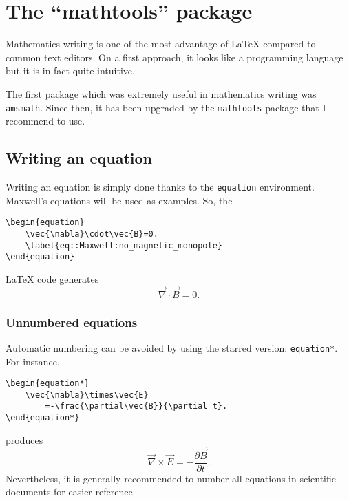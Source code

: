 

\chapter{The \enquote{mathtools} package}

Mathematics writing is one of the most advantage of \LaTeX{} compared to common text editors.
On a first approach, it looks like a programming language but it is in fact quite intuitive.

The first package which was extremely useful in mathematics writing was \texttt{amsmath}.
Since then, it has been upgraded by the \texttt{mathtools} package that I recommend to use.


\section{Writing an equation}

	Writing an equation is simply done thanks to the \texttt{equation} environment.
	Maxwell's equations will be used as examples.
	So, the 
\begin{lstlisting}[language={[LaTeX]TeX}]
\begin{equation}
	\vec{\nabla}\cdot\vec{B}=0.
	\label{eq::Maxwell:no_magnetic_monopole}
\end{equation}
\end{lstlisting}
	\LaTeX{} code generates
	\begin{equation}
		\vec{\nabla}\cdot\vec{B}=0.
		\label{eq::Maxwell:no_magnetic_monopole}
	\end{equation}
	
	
	\subsection{Unnumbered equations}
	
		Automatic numbering can be avoided by using the starred version: \texttt{equation*}.
		For instance,
\begin{lstlisting}[language={[LaTeX]TeX}]
\begin{equation*}
	\vec{\nabla}\times\vec{E}
		=-\frac{\partial\vec{B}}{\partial t}.
\end{equation*}
\end{lstlisting}	
produces
		\begin{equation*}
			\vec{\nabla}\times\vec{E}
				=-\frac{\partial\vec{B}}{\partial t}.
		\end{equation*}
		Nevertheless, it is generally recommended to number all equations in scientific documents for easier reference.
		
